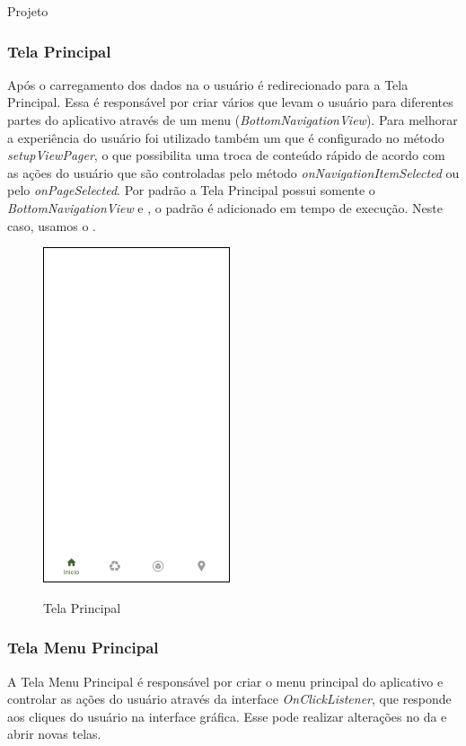 \documentclass[
	12pt,				%
	openany,			%
	twoside,			%
	a4paper,			%
	english,			%
	french,				%
	spanish,			%
	brazil				%
	]{abntex2}
\begin{document}
\begin{chapter}{Projeto}
\subsubsection{Tela Principal} \label{main_activity}
Após o carregamento dos dados na  o usuário é redirecionado para a Tela Principal. Essa  é responsável por criar vários  que levam o usuário para diferentes partes do aplicativo através de um menu (\textit{BottomNavigationView}). Para melhorar a experiência do usuário foi utilizado também um  que é configurado no método \textit{setupViewPager}, o que possibilita uma troca de conteúdo rápido de acordo com as ações do usuário que são controladas pelo método \textit{onNavigationItemSelected} ou pelo \textit{onPageSelected}. Por padrão a Tela Principal possui somente o \textit{BottomNavigationView} e , o  padrão é adicionado em tempo de execução. Neste caso, usamos o .


\begin{figure}[h]
\centering
   \caption{Tela Principal}
   \includegraphics[scale=1.0]{media/activity_main.png}
     \label{fig:activity_main_app}
\end{figure}

\newpage
\subsubsection{Tela Menu Principal} \label{main_fragment}
A Tela Menu Principal é responsável por criar o menu principal do aplicativo e controlar as ações do usuário através da interface \textit{OnClickListener}, que responde aos cliques do usuário na interface gráfica. Esse  pode realizar alterações no  da  e abrir novas telas.


\end{chapter}
\end{document}
